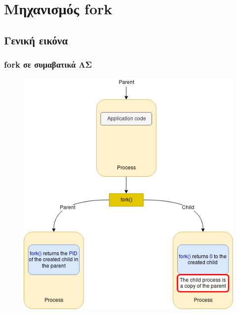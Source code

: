 \documentclass[red,slidestop,notes,compress,mathserif]{beamer}
\begin{document}

\section{Μηχανισμός fork}
\subsection{Γενική εικόνα}

\begin{frame}
\frametitle{fork σε συμαβατικά ΛΣ}
\begin{figure}
\center
\includegraphics[scale=0.36]{figures/fork_details.png}
\end{figure}
\end{frame}
\end{document}
